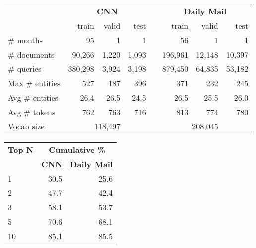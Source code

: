 \begin{table}[t]
\footnotesize
{\centering
  \begin{minipage}[t]{0.65\textwidth}
  \centering
  \begin{tabular}[t]{@{}l@{~}r@{~~}r@{~~}r@{}l@{}r@{~~}r@{~~}r@{}}
    \toprule
    & \multicolumn{3}{c}{{\bf CNN}} &\phantom{aa}& \multicolumn{3}{c}{{\bf
Daily Mail}} \\
    \cmidrule{2-4} \cmidrule{6-8}
    & train & valid & test && train & valid & test \\
    \midrule
    \# months    & 95       & 1     & 1     &&      56 & 1      & 1 \\
    \# documents &  90,266  & 1,220 & 1,093 && 196,961 & 12,148 & 10,397 \\
    \# queries   & 380,298  & 3,924 & 3,198 && 879,450 & 64,835 & 53,182 \\
    Max \# entities & 527   & 187   & 396   && 371     & 232    & 245 \\
    Avg \# entities & 26.4  & 26.5  & 24.5  && 26.5    & 25.5   & 26.0 \\
    Avg \# tokens  & 762    & 763   & 716   && 813     & 774    & 780  \\
    Vocab size & \multicolumn{3}{c}{{118,497}} && \multicolumn{3}{c}{{208,045}} \\
    \bottomrule
  \end{tabular}
  \label{tab:corpora}
\end{minipage}
\hfill
\begin{minipage}[t]{0.33\textwidth}
\footnotesize
  \centering
  \begin{tabular}[t]{@{}l@{~~}r@{~~}r@{}}
    \toprule
    \textbf{Top N} & \multicolumn{2}{c}{{\bf Cumulative \%}} \\
    \cmidrule{2-3}
    & \textbf{CNN} & \textbf{Daily Mail} \\
    \midrule
    1  & 30.5 & 25.6 \\
    2  & 47.7 & 42.4 \\
    3  & 58.1 & 53.7 \\
    5  & 70.6 & 68.1 \\
    10 & 85.1 & 85.5 \\
    \bottomrule
  \end{tabular}
  \label{tab:cloze_hardness}
\end{minipage}
}
\end{table}

